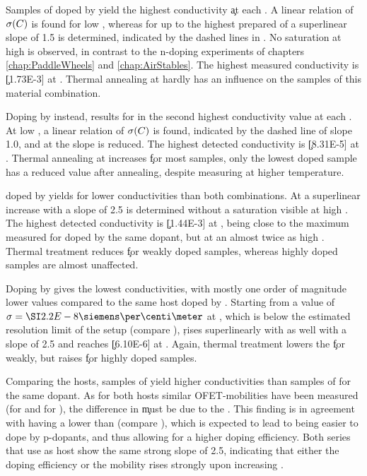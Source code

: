 Samples of \meo doped by \FS yield the highest conductivity \c at each \CLong \C. A linear relation of $\c(\C)$ is found for low \C, whereas for  up to the highest prepared \CLong of \C[0.290] a superlinear slope of 1.5 is determined, indicated by the dashed lines in . No saturation at high \CLongs is observed, in contrast to the n-doping experiments of chapters \ref{chap:PaddleWheels} and \ref{chap:AirStables}.
The highest measured conductivity is \c[1.73E-3] at \C[0.290]. Thermal annealing at \T[45] hardly has an influence on the samples of this material combination.

Doping \meo by \CSF instead, results for  in the second highest conductivity value at each \CLong. At low \CLongs, a linear relation of $\c(\C)$ is found, indicated by the dashed line of slope 1.0, and at  the slope is reduced. The highest detected conductivity is \c[8.31E-5] at \C[0.500]. Thermal annealing at \T[45] increases \c for most samples, only the lowest doped sample has a reduced value after annealing, despite measuring at  higher temperature.

\lili doped by \FS yields for  lower conductivities than both \meo combinations. At  a superlinear increase with a slope of 2.5 is determined without a saturation visible at high \CLongs. The highest detected conductivity is \c[1.44E-3] at \C[0.490], being close to the maximum measured for \meo doped by the same dopant, but at an almost twice as high \C. Thermal treatment reduces \c for weakly doped samples, whereas highly doped samples are almost unaffected.

Doping \lili by \CSF gives the lowest conductivities, with mostly one order of magnitude lower values compared to the same host doped by \FS. Starting from a value of $\c[2.2E-8]$ at \C[0.011], which is below the estimated resolution limit of the setup (compare ), \c rises superlinearly with \C as well with a slope of 2.5 and reaches \c[6.10E-6] at \C[0.200]. Again, thermal treatment lowers the \c for weakly, but raises \c for highly doped samples.

Comparing the hosts, samples of \meo yield higher conductivities than samples of \lili for the same dopant. As for both hosts similar OFET-mobilities have been measured (\mob[2.3E-05] for \meo and \mob[5.7E-05] for \lili), the difference in \c must be due to the \nhLong \nh.
This finding is in agreement with \meo having a lower \IE than \lili (compare ), which is expected to lead to \meo being easier to dope by p-dopants, and thus allowing for a higher doping efficiency. Both series that use \lili as host show the same strong slope of 2.5, indicating that either the doping efficiency or the mobility rises strongly upon increasing \CLong.

